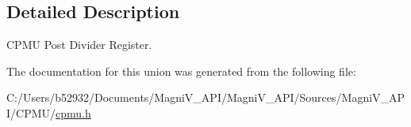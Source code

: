\subsection{Detailed Description}
C\+P\+M\+U Post Divider Register. 

The documentation for this union was generated from the following file\+:\begin{DoxyCompactItemize}
\item 
C\+:/\+Users/b52932/\+Documents/\+Magni\+V\+\_\+\+A\+P\+I/\+Magni\+V\+\_\+\+A\+P\+I/\+Sources/\+Magni\+V\+\_\+\+A\+P\+I/\+C\+P\+M\+U/\hyperlink{cpmu_8h}{cpmu.\+h}\end{DoxyCompactItemize}
